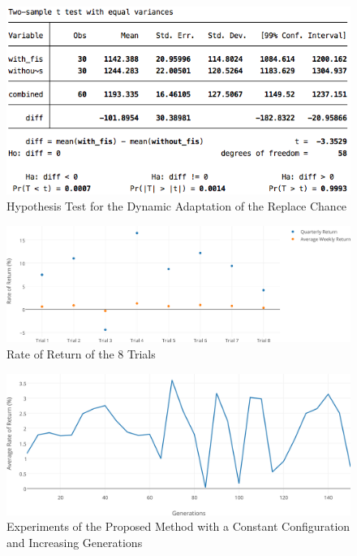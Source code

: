 \documentclass[a4paper,twoside]{article}
\begin{document}
\begin{figure}[h!]
\begin{center}
\includegraphics[width=1.00\columnwidth]{figures/dynamic-parameter-statistical-test/dynamic-parameter-statistical-test}
\caption{{\label{dynamic-hypothesis-test}Hypothesis Test for the Dynamic Adaptation of the Replace Chance%
}}
\end{center}
\end{figure}

\begin{figure}[h!]
\begin{center}
\includegraphics[width=1.00\columnwidth]{figures/percent-return-per-trial/percent-return-per-trial}
\caption{{\label{8-trials}Rate of Return of the 8 Trials%
}}
\end{center}
\end{figure}

\begin{figure}[h!]
\begin{center}
\includegraphics[width=1.00\columnwidth]{figures/avg-rate-of-return/avg-rate-of-return}
\caption{{\label{constant-configuration-generations}Experiments of the Proposed Method with a Constant Configuration and Increasing Generations%
}}
\end{center}
\end{figure}
\end{document}
